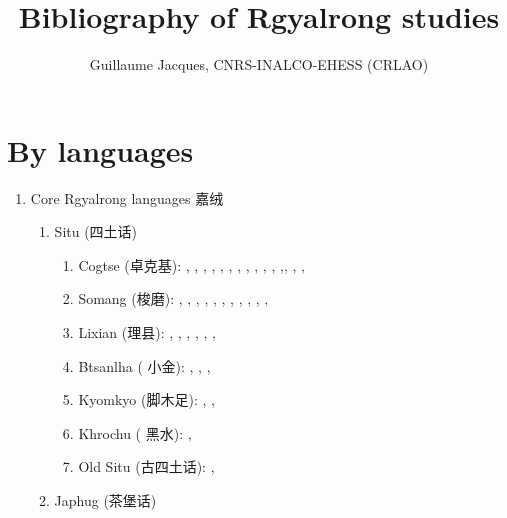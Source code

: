 \documentclass[oldfontcommands,oneside,a4paper,11pt]{article}
\newcommand{\zh}[1]{{\cn #1}}
\newcommand{\langue}[2]{#1}
\begin{document}
  \title{\langue{Bibliography of Rgyalrong studies}{Bibliographie des études rgyalrong}}
 
\author{Guillaume Jacques, CNRS-INALCO-EHESS (CRLAO)}
\maketitle
\sloppy
 
 
\section{\langue{By languages}{Publications classées par langue étudiée}}
\begin{enumerate}
\item \langue{Core Rgyalrong languages \zh{嘉绒}}{Rgyalrong \zh{嘉绒}}
\begin{enumerate}
\item Situ (\zh{四土话})
\begin{enumerate}
\item Cogtse (\zh{卓克基}): \citet{lin83gouci}, \citet{nagano84}, \citet{linxr93jiarong}, \citet{huang93ka}, \citet{hsieh99zhuokeji}, \citet{wei01ka}, \citet{lin02dimension}, \citet{huangsun02}, \citet{youjing03zhuokeji}, \citet{nagano03cogtse}, \citet{jacques03s.houzhui}, \citet{jacksonlin07},\citet{lin09phd}, \citet{lin11direction},  \citet{jacques12agreement}, \citet{gates12situ}
\item Somang (\zh{梭磨}): \citet{jin57suomo}, \citet{jin58suomo}, \citet{bauman75}, \citet{delancey81ergativity},  \citet{delancey81direction}, \citet{qu83rencheng}, \citet{dai92suomo}, \citet{linxr93jiarong}, \citet{yanmuchu05houzhui}, \citet{yanmuchu05sa}, \citet{yanmuchu06hechengci}, 
\item Lixian (\zh{理县}): \citet{wolfenden36jyarung}, \citet{wen40paslok}, \citet{jin49jyarung}, \citet{chang68gyarung}, \citet{chang75gyarung}, \citet{linxr93jiarong},
\item Btsanlha (\zh{ 小金}): \citet{mansier83tsenla}, \citet{linxr93jiarong}, \citet{btsanlha09dict}, \citet{gates12situ}
\item Kyomkyo (\zh{脚木足}): \citet{linxr93jiarong}, \citet{prins11kyomkyo}, \citet{gates12situ}
\item Khrochu (\zh{ 黑水}): \citet{jackson15sastod},
\item \langue{Old Situ}{Ancien situ} (\zh{古四土话}): \citet{ngagdbang10gtamdpe},
\end{enumerate}
\item Japhug (\zh{茶堡话})
\begin{enumerate}

\end{enumerate}
\end{enumerate}
\end{enumerate}
\end{document}
